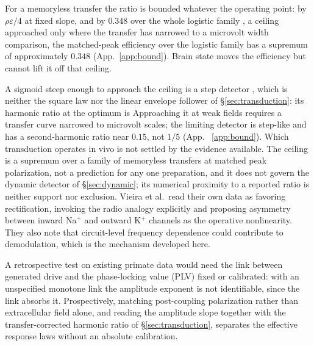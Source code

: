 \documentclass[11pt,a4paper]{article}
\providecommand{\DIFaddtex}[1]{{\protect\color{blue} \sf #1}} %
\providecommand{\DIFdeltex}[1]{{\protect\color{red} \scriptsize #1}} %
\providecommand{\DIFaddbegin}{} %
\providecommand{\DIFaddend}{} %
\providecommand{\DIFdelbegin}{} %
\providecommand{\DIFdelend}{} %
\providecommand{\DIFadd}[1]{\texorpdfstring{\DIFaddtex{#1}}{#1}} %
\providecommand{\DIFdel}[1]{\texorpdfstring{\DIFdeltex{#1}}{}} %
\begin{document}
For \DIFdelbegin \DIFdel{a memoryless transfer the ratio is bounded whatever the operating point: by
$\rho\varepsilon/4$ at fixed slope, and by $0.348$ over the whole logistic family , a
ceiling approached only where the transfer has narrowed to a microvolt width
}\DIFdelend \DIFaddbegin \DIFadd{comparison, the matched-peak efficiency over the logistic family has a supremum
of approximately $0.348$ }\DIFaddend (App.~\ref{app:bound}). \DIFdelbegin \DIFdel{Brain state moves the efficiency but cannot lift it off that
ceiling.
}%

\DIFdel{A sigmoid steep enough to approach the ceiling is a step detector , which is
neither the
square law nor the linear envelope follower of \S\ref{sec:transduction}: its harmonic ratio at the optimum is }\DIFdelend \DIFaddbegin \DIFadd{Approaching it at weak fields
requires a transfer curve narrowed to microvolt scales; the limiting detector is
step-like and has a second-harmonic ratio near }\DIFaddend $0.15$, \DIFdelbegin \DIFdel{not $1/5$ (App. ~\ref{app:bound}). Which transduction operates in
vivo is not settled by the evidence available. The ceiling is a supremum over a family of
memoryless transfers at matched peak polarization, not a prediction for any one
preparation, and it does not govern the dynamic detector of \S\ref{sec:dynamic}; its
numerical proximity to
a reported ratio is neither support nor exclusion. Vieira et al.\ read their own data as
favoring rectification, invoking the radio analogy explicitly and proposing asymmetry
between inward Na$^+$ and outward K$^+$ channels as the operative nonlinearity. They also
note that circuit-level frequency dependence could contribute to demodulation, which is the
mechanism developed here.
}%

\DIFdel{A retrospective test on existing primate data would need the link between generated
drive and the phase-locking value (PLV) fixed or calibrated: with an unspecified monotone
link the amplitude exponent is not identifiable, since the link absorbs it.
Prospectively,
matching post-coupling polarization rather than extracellular field alone, and reading the
amplitude slope together with the transfer-corrected harmonic ratio of
\S\ref{sec:transduction}, separates the effective response laws without an absolute
calibration.
}%
\end{document}
